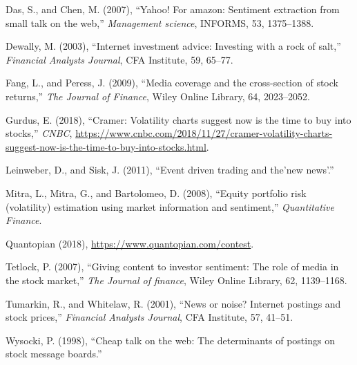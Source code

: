 \documentclass[11,]{article}
\begin{document}
\leavevmode\hypertarget{ref-das2007}{}%
Das, S., and Chen, M. (2007), ``Yahoo! For amazon: Sentiment extraction
from small talk on the web,'' \emph{Management science}, INFORMS, 53,
1375--1388.

\leavevmode\hypertarget{ref-dewally2003}{}%
Dewally, M. (2003), ``Internet investment advice: Investing with a rock
of salt,'' \emph{Financial Analysts Journal}, CFA Institute, 59, 65--77.

\leavevmode\hypertarget{ref-fang2009}{}%
Fang, L., and Peress, J. (2009), ``Media coverage and the cross-section
of stock returns,'' \emph{The Journal of Finance}, Wiley Online Library,
64, 2023--2052.

\leavevmode\hypertarget{ref-cramer2018}{}%
Gurdus, E. (2018), ``Cramer: Volatility charts suggest now is the time
to buy into stocks,'' \emph{CNBC},
\url{https://www.cnbc.com/2018/11/27/cramer-volatility-charts-suggest-now-is-the-time-to-buy-into-stocks.html}.

\leavevmode\hypertarget{ref-leinweber2011}{}%
Leinweber, D., and Sisk, J. (2011), ``Event driven trading and the'new
news'.''

\leavevmode\hypertarget{ref-mitra2008}{}%
Mitra, L., Mitra, G., and Bartolomeo, D. (2008), ``Equity portfolio risk
(volatility) estimation using market information and sentiment,''
\emph{Quantitative Finance}.

\leavevmode\hypertarget{ref-q}{}%
Quantopian (2018), \url{https://www.quantopian.com/contest}.

\leavevmode\hypertarget{ref-tetlock2007}{}%
Tetlock, P. (2007), ``Giving content to investor sentiment: The role of
media in the stock market,'' \emph{The Journal of finance}, Wiley Online
Library, 62, 1139--1168.

\leavevmode\hypertarget{ref-tumarkin2001}{}%
Tumarkin, R., and Whitelaw, R. (2001), ``News or noise? Internet
postings and stock prices,'' \emph{Financial Analysts Journal}, CFA
Institute, 57, 41--51.

\leavevmode\hypertarget{ref-wysocki1998}{}%
Wysocki, P. (1998), ``Cheap talk on the web: The determinants of
postings on stock message boards.''
\end{document}
